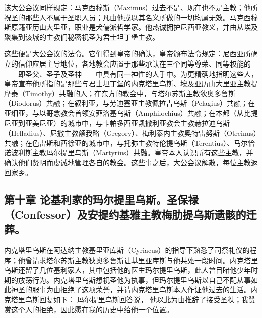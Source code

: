 该大公会议同样规定：马克西穆斯（Maximus）过去不是、现在也不是主教；他所祝圣的那些人不属于圣职人员；凡由他或以其名义所做的一切均属无效。马克西穆斯原籍亚历山大里亚，职业是犬儒派哲学家。他热诚拥护尼西亚教义，并由从埃及聚集到该城的主教们秘密祝圣为君士坦丁堡主教。\par

这些便是大公会议的法令。它们得到皇帝的确认，皇帝颁布法令规定：尼西亚所确立的信仰应居主导地位，各地教会应置于那些承认在三个同等尊荣、同等权能的——即圣父、圣子及圣神——中具有同一神性的人手中。为更精确地指明这些人，皇帝宣布他所指的是那些与君士坦丁堡的内克塔里乌斯、埃及亚历山大里亚主教提摩泰（Timothy）共融的人；在东方的教会中，与塔尔苏斯主教狄奥多鲁斯（Diodorus）共融；在叙利亚，与劳迪塞亚主教佩拉吉乌斯（Pelagius）共融；在亚细亚，与以哥念教会首领安菲洛基乌斯（Amphilochius）共融；在本都（从比提尼亚到亚美尼亚）的城市中，与卡帕多西亚凯撒利亚教会主教赫拉迪乌斯（Helladius）、尼撒主教额我略（Gregory）、梅利泰内主教奥特雷努斯（Otreinus）共融；在色雷斯和西徐亚的城市中，与托弥主教特伦提乌斯（Terentius）、马尔恰诺波利斯主教玛尔提里乌斯（Martyrius）共融。皇帝本人认识所有这些主教，并确认他们贤明而虔诚地管理各自的教会。这些事之后，大公会议解散，每位主教返回家乡。\par


\subsection{第十章 论基利家的玛尔提里乌斯。圣保禄（Confessor）及安提约基雅主教梅肋提乌斯遗骸的迁葬。}

内克塔里乌斯在阿达纳主教基里亚库斯（Cyriacus）的指导下熟悉了司祭礼仪的程序；他曾请求塔尔苏斯主教狄奥多鲁斯让基里亚库斯与他共处一段时间。内克塔里乌斯还留了几位基利家人，其中包括他的医生玛尔提里乌斯，此人曾目睹他少年时期的放荡行为。内克塔里乌斯想祝圣他为执事，但玛尔提里乌斯以自己不配从事如此神圣的服事为由拒绝了这项荣誉，并请内克塔里乌斯本人作证他过去的生活。内克塔里乌斯回复如下： 玛尔提里乌斯回答说， 他以此为由推辞了接受圣秩；我赞赏这个人的拒绝，因此愿在我的历史中给他一个位置。\par

